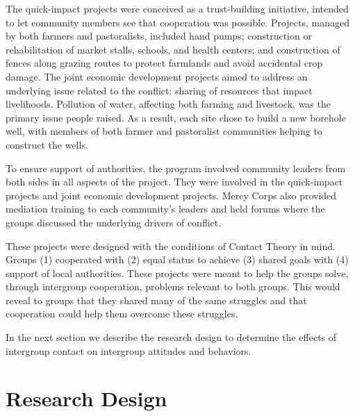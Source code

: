 \documentclass[11pt]{article}
\begin{document}
The quick-impact projects were conceived as a trust-building initiative,
intended to let community members see that cooperation was possible.
Projects, managed by both farmers and pastoralists, included hand pumps;
construction or rehabilitation of market stalls, schools, and health
centers; and construction of fences along grazing routes to protect
farmlands and avoid accidental crop damage. The joint economic
development projects aimed to address an underlying issue related to the
conflict: sharing of resources that impact livelihoods. Pollution of
water, affecting both farming and livestock, was the primary issue
people raised. As a result, each site chose to build a new borehole
well, with members of both farmer and pastoralist communities helping to
construct the wells.

To ensure support of authorities, the program involved community leaders
from both sides in all aspects of the project. They were involved in the
quick-impact projects and joint economic development projects. Mercy
Corps also provided mediation training to each community's leaders and
held forums where the groups discussed the underlying drivers of
conflict.

These projects were designed with the conditions of Contact Theory in
mind. Groups (1) cooperated with (2) equal status to achieve (3) shared
goals with (4) support of local authorities. These projects were meant
to help the groups solve, through intergroup cooperation, problems
relevant to both groups. This would reveal to groups that they shared
many of the same struggles and that cooperation could help them overcome
these struggles.

In the next section we describe the research design to determine the
effects of intergroup contact on intergroup attitudes and behaviors.

\hypertarget{research-design}{%
\section{Research Design}\label{research-design}}
\end{document}
